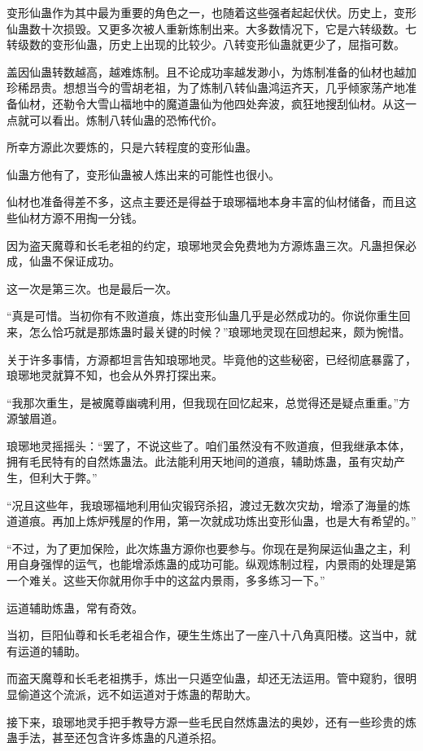 \begin{this_body}
变形仙蛊作为其中最为重要的角色之一，也随着这些强者起起伏伏。历史上，变形仙蛊数十次损毁。又更多次被人重新炼制出来。大多数情况下，它是六转级数。七转级数的变形仙蛊，历史上出现的比较少。八转变形仙蛊就更少了，屈指可数。

盖因仙蛊转数越高，越难炼制。且不论成功率越发渺小，为炼制准备的仙材也越加珍稀昂贵。想想当今的雪胡老祖，为了炼制八转仙蛊鸿运齐天，几乎倾家荡产地准备仙材，还勒令大雪山福地中的魔道蛊仙为他四处奔波，疯狂地搜刮仙材。从这一点就可以看出。炼制八转仙蛊的恐怖代价。

所幸方源此次要炼的，只是六转程度的变形仙蛊。

仙蛊方他有了，变形仙蛊被人炼出来的可能性也很小。

仙材也准备得差不多，这点主要还是得益于琅琊福地本身丰富的仙材储备，而且这些仙材方源不用掏一分钱。

因为盗天魔尊和长毛老祖的约定，琅琊地灵会免费地为方源炼蛊三次。凡蛊担保必成，仙蛊不保证成功。

这一次是第三次。也是最后一次。

“真是可惜。当初你有不败道痕，炼出变形仙蛊几乎是必然成功的。你说你重生回来，怎么恰巧就是那炼蛊时最关键的时候？”琅琊地灵现在回想起来，颇为惋惜。

关于许多事情，方源都坦言告知琅琊地灵。毕竟他的这些秘密，已经彻底暴露了，琅琊地灵就算不知，也会从外界打探出来。

“我那次重生，是被魔尊幽魂利用，但我现在回忆起来，总觉得还是疑点重重。”方源皱眉道。

琅琊地灵摇摇头：“罢了，不说这些了。咱们虽然没有不败道痕，但我继承本体，拥有毛民特有的自然炼蛊法。此法能利用天地间的道痕，辅助炼蛊，虽有灾劫产生，但利大于弊。”

“况且这些年，我琅琊福地利用仙灾锻窍杀招，渡过无数次灾劫，增添了海量的炼道道痕。再加上炼炉残屋的作用，第一次就成功炼出变形仙蛊，也是大有希望的。”

“不过，为了更加保险，此次炼蛊方源你也要参与。你现在是狗屎运仙蛊之主，利用自身强悍的运气，也能增添炼蛊的成功可能。纵观炼制过程，内景雨的处理是第一个难关。这些天你就用你手中的这盆内景雨，多多练习一下。”

运道辅助炼蛊，常有奇效。

当初，巨阳仙尊和长毛老祖合作，硬生生炼出了一座八十八角真阳楼。这当中，就有运道的辅助。

而盗天魔尊和长毛老祖携手，炼出一只遁空仙蛊，却还无法运用。管中窥豹，很明显偷道这个流派，远不如运道对于炼蛊的帮助大。

接下来，琅琊地灵手把手教导方源一些毛民自然炼蛊法的奥妙，还有一些珍贵的炼蛊手法，甚至还包含许多炼蛊的凡道杀招。


\end{this_body}
